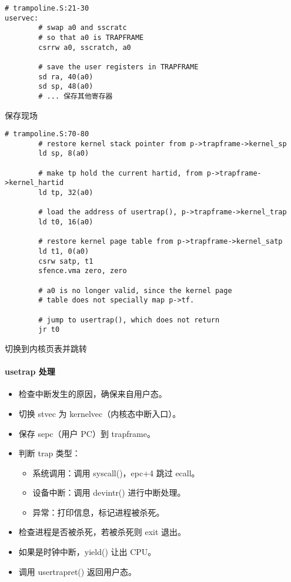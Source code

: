 \begin{listing}[!htb]
	\begin{verbatim}
# trampoline.S:21-30
uservec:    
        # swap a0 and sscratc
        # so that a0 is TRAPFRAME
        csrrw a0, sscratch, a0
        
        # save the user registers in TRAPFRAME
        sd ra, 40(a0)
        sd sp, 48(a0)
        # ... 保存其他寄存器
	\end{verbatim}
	\caption{保存现场}\label{lst:save_scene}
\end{listing}

\begin{listing}[!htb]
	\begin{verbatim}
# trampoline.S:70-80
        # restore kernel stack pointer from p->trapframe->kernel_sp
        ld sp, 8(a0)
        
        # make tp hold the current hartid, from p->trapframe->kernel_hartid
        ld tp, 32(a0)
        
        # load the address of usertrap(), p->trapframe->kernel_trap
        ld t0, 16(a0)
        
        # restore kernel page table from p->trapframe->kernel_satp
        ld t1, 0(a0)
        csrw satp, t1
        sfence.vma zero, zero
        
        # a0 is no longer valid, since the kernel page
        # table does not specially map p->tf.
        
        # jump to usertrap(), which does not return
        jr t0
	\end{verbatim}
	\caption{切换到内核页表并跳转}\label{lst:switch_to_kernel_page_table}
\end{listing}

\paragraph{usetrap 处理}

\begin{itemize}
	\item 检查中断发生的原因，确保来自用户态。
	\item 切换 stvec 为 kernelvec（内核态中断入口）。
	\item 保存 sepc（用户 PC）到 trapframe。
	\item 判断 trap 类型：
	\begin{itemize}
		\item 系统调用：调用 syscall()，epc+4 跳过 ecall。
		\item 设备中断：调用 devintr() 进行中断处理。
		\item 异常：打印信息，标记进程被杀死。
	\end{itemize}
	\item 检查进程是否被杀死，若被杀死则 exit 退出。
	\item 如果是时钟中断，yield() 让出 CPU。
	\item 调用 usertrapret() 返回用户态。
\end{itemize}

